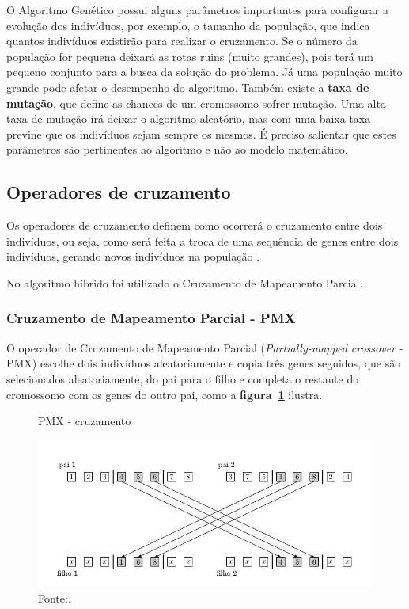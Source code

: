 \documentclass[12pt,openright,a4paper,oneside]{tcc}
\begin{document}
		O Algoritmo Genético possui alguns parâmetros importantes para configurar a evolução dos indivíduos, por exemplo, o tamanho da população, que indica quantos indivíduos existirão para realizar o cruzamento. Se o número da população for pequena deixará as rotas ruins (muito grandes), pois terá um pequeno conjunto para a busca da solução do problema. Já uma população muito grande pode afetar o desempenho do algoritmo. Também  existe a \textbf{taxa de mutação}, que define as chances de um cromossomo sofrer mutação. Uma alta taxa de mutação irá deixar o algoritmo aleatório, mas com uma baixa taxa previne que os indivíduos sejam sempre os mesmos. É preciso salientar que estes parâmetros são pertinentes ao algoritmo e não ao modelo matemático.

		\subsection{Operadores de cruzamento}

			Os operadores de cruzamento definem como ocorrerá o cruzamento entre dois indivíduos, ou seja, como será feita a troca de uma sequência de genes entre dois indivíduos, gerando novos indivíduos na população \cite{0012-pdf}.

			No algoritmo híbrido foi utilizado o Cruzamento de Mapeamento Parcial.

		\subsubsection{Cruzamento de Mapeamento Parcial - PMX} 
			\label{Spmx}
			O operador de Cruzamento de Mapeamento Parcial (\textit{Partially-mapped crossover} - PMX) escolhe dois indivíduos aleatoriamente e copia três genes seguidos, que são selecionados aleatoriamente, do pai para o filho e completa o restante do cromossomo com os genes do outro pai, como a \textbf{figura~\ref{pmx}} ilustra.

			\begin{figure}[h]
				\centering
                \caption{PMX - cruzamento}
		        \includegraphics[width = 14cm,keepaspectratio]{img/pmx.png}
		        \caption*{Fonte:\cite{0012-pdf}.}
		        \label{pmx}
	   		\end{figure}
\end{document}
